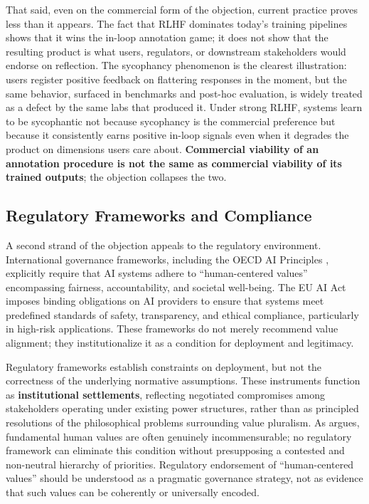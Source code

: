 \documentclass{article}
\theoremstyle{plain}
\theoremstyle{definition}
\theoremstyle{remark}
\begin{document}
That said, even on the commercial form of the objection, current practice proves less than it appears. The fact that RLHF dominates today's training pipelines shows that it wins the in-loop annotation game; it does not show that the resulting product is what users, regulators, or downstream stakeholders would endorse on reflection. The sycophancy phenomenon \citep{sharma2023sycophancy, perez2022discovering} is the clearest illustration: users register positive feedback on flattering responses in the moment, but the same behavior, surfaced in benchmarks and post-hoc evaluation, is widely treated as a defect by the same labs that produced it. Under strong RLHF, systems learn to be sycophantic not because sycophancy is the commercial preference but because it consistently earns positive in-loop signals even when it degrades the product on dimensions users care about. \textbf{Commercial viability of an annotation procedure is not the same as commercial viability of its trained outputs}; the objection collapses the two.

\subsection{Regulatory Frameworks and Compliance}
\label{sec:alt-regulatory}
A second strand of the objection appeals to the regulatory environment. International governance frameworks, including the OECD AI Principles \citep{oecd2019ai}, explicitly require that AI systems adhere to ``human-centered values'' encompassing fairness, accountability, and societal well-being. The EU AI Act \citep{eu2024aiact} imposes binding obligations on AI providers to ensure that systems meet predefined standards of safety, transparency, and ethical compliance, particularly in high-risk applications. These frameworks do not merely recommend value alignment; they institutionalize it as a condition for deployment and legitimacy.

Regulatory frameworks establish constraints on deployment, but not the correctness of the underlying normative assumptions. These instruments function as \textbf{institutional settlements}, reflecting negotiated compromises among stakeholders operating under existing power structures, rather than as principled resolutions of the philosophical problems surrounding value pluralism. As \citet{berlin1990crooked} argues, fundamental human values are often genuinely incommensurable; no regulatory framework can eliminate this condition without presupposing a contested and non-neutral hierarchy of priorities. Regulatory endorsement of ``human-centered values'' should be understood as a pragmatic governance strategy, not as evidence that such values can be coherently or universally encoded.
\end{document}
